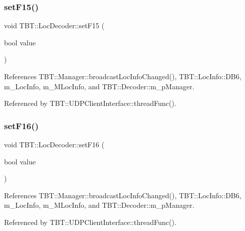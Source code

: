 \subsubsection{\texorpdfstring{set\+F15()}{setF15()}}
{\footnotesize\ttfamily void T\+B\+T\+::\+Loc\+Decoder\+::set\+F15 (\begin{DoxyParamCaption}\item[{bool}]{value }\end{DoxyParamCaption})\hspace{0.3cm}{\ttfamily [inline]}}



References T\+B\+T\+::\+Manager\+::broadcast\+Loc\+Info\+Changed(), T\+B\+T\+::\+Loc\+Info\+::\+D\+B6, m\+\_\+\+Loc\+Info, m\+\_\+\+M\+Loc\+Info, and T\+B\+T\+::\+Decoder\+::m\+\_\+p\+Manager.



Referenced by T\+B\+T\+::\+U\+D\+P\+Client\+Interface\+::thread\+Func().

\mbox{\label{classTBT_1_1LocDecoder_a0a1a0f36dbe6b3c0c50eda41eb7b673e_a0a1a0f36dbe6b3c0c50eda41eb7b673e}} 
\subsubsection{\texorpdfstring{set\+F16()}{setF16()}}
{\footnotesize\ttfamily void T\+B\+T\+::\+Loc\+Decoder\+::set\+F16 (\begin{DoxyParamCaption}\item[{bool}]{value }\end{DoxyParamCaption})\hspace{0.3cm}{\ttfamily [inline]}}



References T\+B\+T\+::\+Manager\+::broadcast\+Loc\+Info\+Changed(), T\+B\+T\+::\+Loc\+Info\+::\+D\+B6, m\+\_\+\+Loc\+Info, m\+\_\+\+M\+Loc\+Info, and T\+B\+T\+::\+Decoder\+::m\+\_\+p\+Manager.



Referenced by T\+B\+T\+::\+U\+D\+P\+Client\+Interface\+::thread\+Func().

\mbox{\label{classTBT_1_1LocDecoder_ad1355610f7158630e75af3df1e4d01c4_ad1355610f7158630e75af3df1e4d01c4}} 
